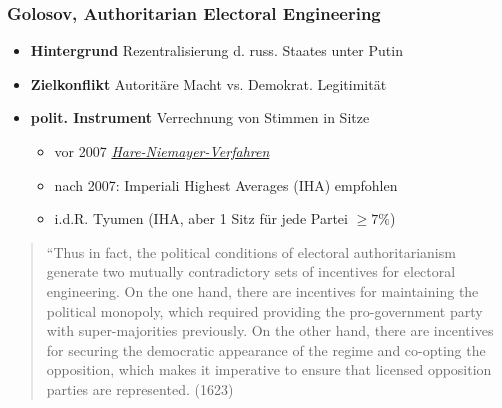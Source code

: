 \documentclass{beamer}\usepackage[]{graphicx}\usepackage[]{color}
\begin{document}
\begin{frame}
  \frametitle{Golosov, Authoritarian Electoral Engineering}
  \begin{itemize}
    \item \textbf{Hintergrund} Rezentralisierung d. russ. Staates unter Putin
    \item \textbf{Zielkonflikt} Autoritäre Macht vs. Demokrat. Legitimität
    \item \textbf{polit. Instrument} Verrechnung von Stimmen in Sitze
    \begin{itemize}
      \item vor 2007 \href{https://de.wikipedia.org/wiki/Hare-Niemeyer-Verfahren}{\textit{Hare-Niemayer-Verfahren}}
      \item nach 2007: Imperiali Highest Averages (IHA) empfohlen
      \item i.d.R. Tyumen (IHA, aber 1 Sitz für jede Partei $\geq 7\%$)
    \end{itemize}
  \end{itemize}
  \begin{quote}
  \textnormal{%
    \scriptsize{%
      ``Thus in fact, the political conditions of electoral
      authoritarianism generate two mutually contradictory
      sets of incentives for electoral engineering. On the
      one hand, there are incentives for maintaining the
      political monopoly, which required providing the
      pro-government party with super-majorities previously.
      On the other hand, there are incentives for securing
      the democratic appearance of the regime and co-opting
      the opposition, which makes it imperative to ensure
      that licensed opposition parties are represented. (1623)
    }
  }
  \end{quote}
\end{frame}
\end{document}
